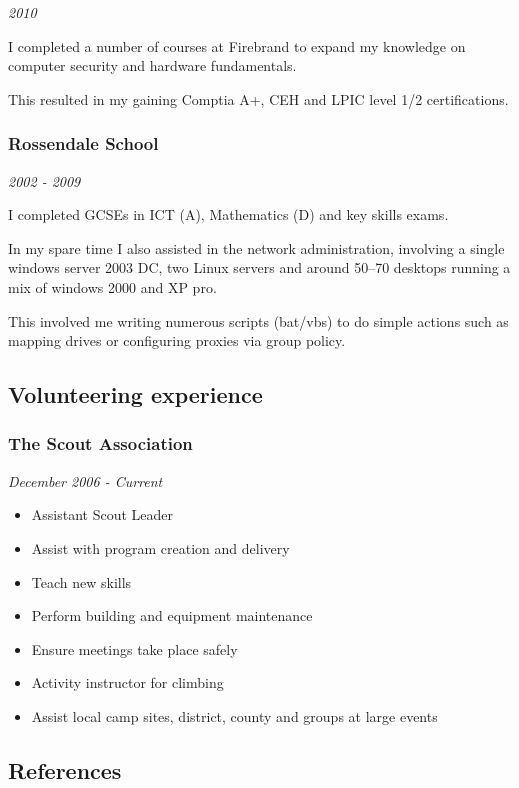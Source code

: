\emph{2010}

I completed a number of courses at Firebrand to expand my knowledge on
computer security and hardware fundamentals.

This resulted in my gaining Comptia A+, CEH and LPIC level 1/2
certifications.

\subsubsection{Rossendale School}

\emph{2002 - 2009}

I completed GCSEs in ICT (A), Mathematics (D) and key skills exams.

In my spare time I also assisted in the network administration,
involving a single windows server 2003 DC, two Linux servers and around
50--70 desktops running a mix of windows 2000 and XP pro.

This involved me writing numerous scripts (bat/vbs) to do simple actions
such as mapping drives or configuring proxies via group policy.

\subsection{Volunteering experience}

\subsubsection{The Scout Association}

\emph{December 2006 - Current}

\begin{itemize}
\item
  Assistant Scout Leader
\item
  Assist with program creation and delivery
\item
  Teach new skills
\item
  Perform building and equipment maintenance
\item
  Ensure meetings take place safely
\item
  Activity instructor for climbing
\item
  Assist local camp sites, district, county and groups at large events
\end{itemize}
\subsection{References}

